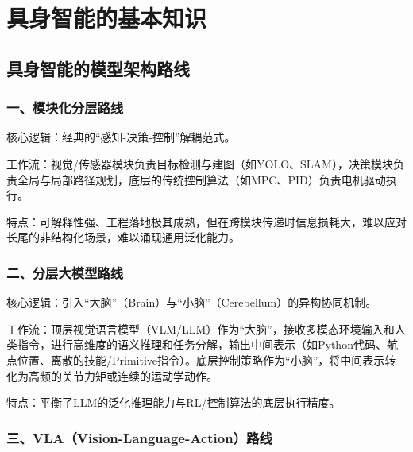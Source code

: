 \hypertarget{ux5177ux8eabux667aux80fdux7684ux57faux672cux77e5ux8bc6}{%
\chapter{具身智能的基本知识}\label{ux5177ux8eabux667aux80fdux7684ux57faux672cux77e5ux8bc6}}

\hypertarget{ux5177ux8eabux667aux80fdux7684ux6a21ux578bux67b6ux6784ux8defux7ebf}{%
\section{具身智能的模型架构路线}\label{ux5177ux8eabux667aux80fdux7684ux6a21ux578bux67b6ux6784ux8defux7ebf}}

\hypertarget{ux4e00ux6a21ux5757ux5316ux5206ux5c42ux8defux7ebf}{%
\subsection{一、模块化分层路线}\label{ux4e00ux6a21ux5757ux5316ux5206ux5c42ux8defux7ebf}}

核心逻辑：经典的``感知-决策-控制''解耦范式。

工作流：视觉/传感器模块负责目标检测与建图（如YOLO、SLAM），决策模块负责全局与局部路径规划，底层的传统控制算法（如MPC、PID）负责电机驱动执行。

特点：可解释性强、工程落地极其成熟，但在跨模块传递时信息损耗大，难以应对长尾的非结构化场景，难以涌现通用泛化能力。

\hypertarget{ux4e8cux5206ux5c42ux5927ux6a21ux578bux8defux7ebf}{%
\subsection{二、分层大模型路线}\label{ux4e8cux5206ux5c42ux5927ux6a21ux578bux8defux7ebf}}

核心逻辑：引入``大脑''（Brain）与``小脑''（Cerebellum）的异构协同机制。

工作流：顶层视觉语言模型（VLM/LLM）作为``大脑''，接收多模态环境输入和人类指令，进行高维度的语义推理和任务分解，输出中间表示（如Python代码、航点位置、离散的技能/Primitive指令）。底层控制策略作为``小脑''，将中间表示转化为高频的关节力矩或连续的运动学动作。

特点：平衡了LLM的泛化推理能力与RL/控制算法的底层执行精度。

\hypertarget{ux4e09vlavision-language-actionux8defux7ebf}{%
\subsection{三、VLA（Vision-Language-Action）路线}\label{ux4e09vlavision-language-actionux8defux7ebf}}

